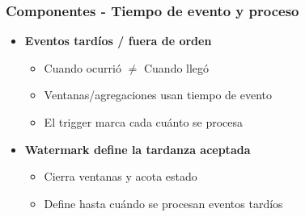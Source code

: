\documentclass[aspectratio=169]{beamer}
\begin{document}
\begin{frame}\frametitle{Componentes - Tiempo de evento y proceso}
	\begin{itemize}
		\item \textbf{Eventos tardíos / fuera de orden}
		\begin{itemize}
			\item Cuando ocurrió $\neq$ Cuando llegó
			\item Ventanas/agregaciones usan tiempo de evento
			\item El trigger marca cada cuánto se procesa
		\end{itemize}

		\vspace{1em}

		\item \textbf{Watermark define la tardanza aceptada}
		\begin{itemize}
			\item Cierra ventanas y acota estado
			\item Define hasta cuándo se procesan eventos tardíos
		\end{itemize}
	\end{itemize}
\end{frame}
\end{document}
